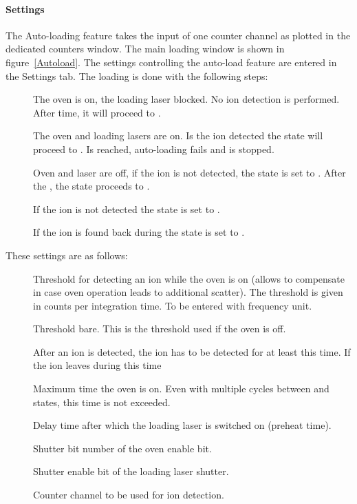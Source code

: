 \documentclass[11pt]{scrartcl}
\begin{document}
\paragraph{Settings}
The Auto-loading feature takes the input of one counter channel as plotted in the dedicated counters window. The main loading window is shown in figure~\ref{Autoload}. The settings controlling the auto-load feature are entered in the Settings tab. The loading is done with the following steps: 
\begin{description}
\item[] The oven is on, the loading laser blocked. No ion detection is performed. After  time, it will proceed to .
\item[] The oven and loading lasers are on. Is the ion detected the state will proceed to . Is  reached, auto-loading fails and is stopped.
\item[] Oven and laser are off, if the ion is not detected, the state is set to . After the , the state proceeds to .
\item[] If the ion is not detected the state is set to .
\item[] If the ion is found back during  the state is set to .
\end{description}
These settings are as follows:
\begin{description}
\item[] Threshold for detecting an ion while the oven is on (allows to compensate in case oven operation leads to additional scatter). The threshold is given in counts per integration time. To be entered with frequency unit.
\item[] Threshold bare. This is the threshold used if the oven is off.
\item[] After an ion is detected, the ion has to be detected for at least this time. If the ion leaves during this time
\item[] Maximum time the oven is on. Even with multiple cycles between  and  states, this time is not exceeded.
\item[] Delay time after which the loading laser is switched on (preheat time).
\item[] Shutter bit number of the oven enable bit. 
\item[] Shutter enable bit of the loading laser shutter.
\item[] Counter channel to be used for ion detection.
\end{description}
\end{document}
